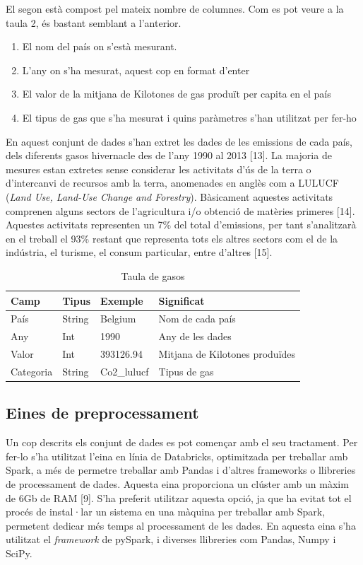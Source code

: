 \documentclass[10pt,a4paper,twocolumn,twoside]{article}
\begin{document}
El segon està compost pel mateix nombre de columnes. Com es pot veure a la taula 2, és bastant semblant a l'anterior. 
\begin{enumerate}
\item El nom del país on s'està mesurant.
\item L'any on s'ha mesurat, aquest cop en format d'enter
\item El valor de la mitjana de Kilotones de gas produït per capita en el país
\item El tipus de gas que s'ha mesurat i quins paràmetres s'han utilitzat per fer-ho
\end{enumerate}
En aquest conjunt de dades s'han extret les dades de les emissions de cada país, dels diferents gasos hivernacle des de l'any 1990 al 2013 [13]. La majoria de mesures estan extretes sense considerar les activitats d'ús de la terra o d'intercanvi de recursos amb la terra, anomenades en anglès com a LULUCF (\textit{Land Use, Land-Use Change and Forestry}). Bàsicament aquestes activitats comprenen alguns sectors de l'agricultura i/o obtenció de matèries primeres [14]. Aquestes activitats representen un 7\% del total d'emissions, per tant s'analitzarà en el treball el 93\% restant que representa tots els altres sectors com el de la indústria, el turisme, el consum particular, entre d'altres [15].
\begin{table}[th]
\caption{Taula de gasos}
\begin{center}
\begin{tabular}{  m{2cm} m{1cm} m{1.2cm} m{1.8cm} }
\hline\hline %
Camp & Tipus & Exemple & Significat \\
\hline
País & String & Belgium & Nom de cada país \\
\hline
Any & Int & 1990 & Any de les dades \\
\hline
Valor & Int & 393126.94 & Mitjana de Kilotones produïdes \\
\hline
Categoria & String & Co2\_lulucf  & Tipus de gas\\
\hline
\hline
\end{tabular}
\end{center}
\end{table}
\subsection{Eines de preprocessament}
Un cop descrits els conjunt de dades es pot començar amb el seu tractament. Per fer-lo s'ha utilitzat l'eina en línia de Databricks, optimitzada per treballar amb Spark, a més de permetre treballar amb Pandas i d'altres frameworks o llibreries de processament de dades. Aquesta eina proporciona un clúster amb un màxim de 6Gb de RAM [9]. S'ha preferit utilitzar aquesta opció, ja que ha evitat tot el procés de instal·lar un sistema en una màquina per treballar amb Spark, permetent dedicar més temps al processament de les dades. En aquesta eina s'ha utilitzat el \textit{framework} de pySpark, i diverses llibreries com Pandas, Numpy i SciPy.
\end{document}
